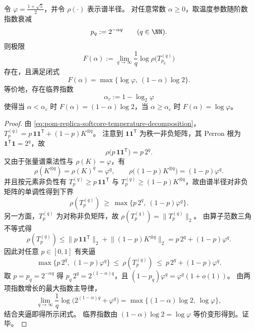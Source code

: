 \begin{theorem}\label{thm:pom-replica-softcore-temperature-free-energy-phase-transition}
令 \(\varphi=\frac{1+\sqrt5}{2}\)，并令 \(\rho(\cdot)\) 表示谱半径。
对任意常数 \(\alpha\ge 0\)，取温度参数随阶数指数衰减
\[
p_q:=2^{-\alpha q}\qquad(q\in\NN).
\]
则极限
\[
F(\alpha):=\lim_{q\to\infty}\frac1q\log \rho\!\bigl(T_{p_q}^{(q)}\bigr)
\]
存在，且满足闭式
\[
F(\alpha)=\max\bigl\{\log\varphi,\ (1-\alpha)\log 2\bigr\}.
\]
等价地，存在临界指数
\[
\alpha_c:=1-\log_2\varphi
\]
使得当 \(\alpha<\alpha_c\) 时 \(F(\alpha)=(1-\alpha)\log 2\)，当 \(\alpha\ge\alpha_c\) 时 \(F(\alpha)=\log\varphi\)。
\end{theorem}

\begin{proof}
由 \eqref{eq:pom-replica-softcore-temperature-decomposition}，
\(
T^{(q)}_{p}=p\,\mathbf1\mathbf1^{\mathsf T}+(1-p)K^{\otimes q}
\)。
注意到 \(\mathbf1\mathbf1^{\mathsf T}\) 为秩一非负矩阵，其 Perron 根为 \(\mathbf1^{\mathsf T}\mathbf1=2^q\)，故
\[
\rho\!\bigl(p\,\mathbf1\mathbf1^{\mathsf T}\bigr)=p\,2^q.
\]
又由于张量谱乘法性与 \(\rho(K)=\varphi\)，有
\[
\rho(K^{\otimes q})=\rho(K)^q=\varphi^q,
\qquad
\rho\!\bigl((1-p)K^{\otimes q}\bigr)=(1-p)\varphi^q.
\]
并且按元素非负性有 \(T_p^{(q)}\ge p\,\mathbf1\mathbf1^{\mathsf T}\) 与 \(T_p^{(q)}\ge(1-p)K^{\otimes q}\)，故由谱半径对非负矩阵的单调性得到下界
\[
\rho(T_p^{(q)})\ \ge\ \max\bigl\{p\,2^q,\ (1-p)\varphi^q\bigr\}.
\]
另一方面，\(T_p^{(q)}\) 为对称非负矩阵，故 \(\rho(T_p^{(q)})=\|T_p^{(q)}\|_2\)。
由算子范数三角不等式得
\[
\rho(T_p^{(q)})
\le
\bigl\|p\,\mathbf1\mathbf1^{\mathsf T}\bigr\|_2+\bigl\|(1-p)K^{\otimes q}\bigr\|_2
=p\,2^q+(1-p)\varphi^q.
\]
因此对任意 \(p\in[0,1]\) 有夹逼
\[
\max\bigl\{p\,2^q,\ (1-p)\varphi^q\bigr\}
\ \le\
\rho(T_p^{(q)})
\ \le\
p\,2^q+(1-p)\varphi^q.
\]
取 \(p=p_q=2^{-\alpha q}\) 得 \(p_q\,2^q=2^{(1-\alpha)q}\)，且 \((1-p_q)\varphi^q=\varphi^q(1+o(1))\)。
由两项指数增长的最大指数主导律，
\[
\lim_{q\to\infty}\frac1q\log\bigl(2^{(1-\alpha)q}+\varphi^q\bigr)
=\max\bigl\{(1-\alpha)\log 2,\ \log\varphi\bigr\},
\]
结合夹逼即得所示闭式。
临界指数由 \((1-\alpha)\log2=\log\varphi\) 等价变形得到。证毕。
\end{proof}
